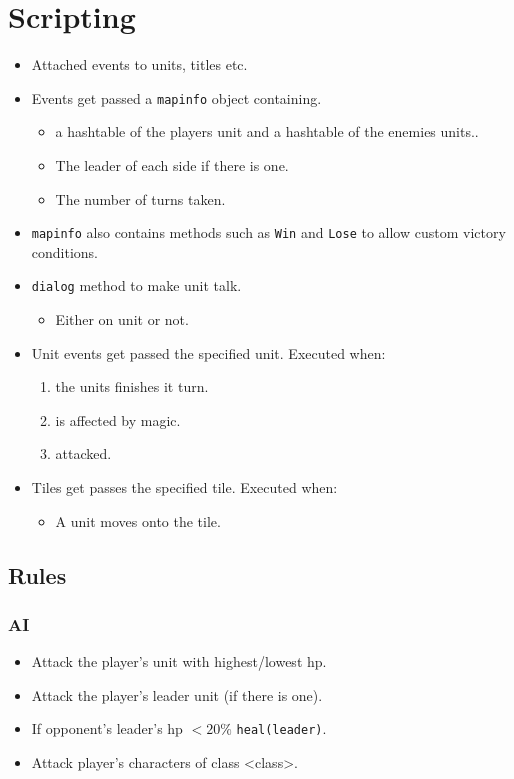\section{Scripting}
\label{sec:Scripting}
\begin{itemize}



\item Attached events to units, titles etc.

\item Events get passed a \texttt{mapinfo} object containing.
\begin{itemize}
	\item a hashtable of the players unit and a hashtable of the enemies units..
	\item The leader of each side if there is one.
	\item The number of turns taken.
\end{itemize}

\item \texttt{mapinfo} also contains methods such as \texttt{Win} and \texttt{Lose} to allow custom victory conditions.

\item \texttt{dialog} method to make unit talk.
\begin{itemize}
	\item Either on unit or not.
\end{itemize}

\item Unit events get passed the specified unit. Executed when:
\begin{enumerate}
	\item the units finishes it turn.
	\item is affected by magic.
	\item attacked.
\end{enumerate}

\item Tiles get passes the specified tile. Executed when:
\begin{itemize}
	\item A unit moves onto the tile.
\end{itemize}

\end{itemize}

\subsection{Rules}
\subsubsection{AI}
\begin{itemize}
	\item Attack the player's unit with  highest/lowest hp.
	\item Attack the player's leader unit (if there is one).
	\item If opponent's leader's hp $< 20\%$ \texttt{heal(leader)}.
	\item Attack player's characters of class <class>.
\end{itemize}


